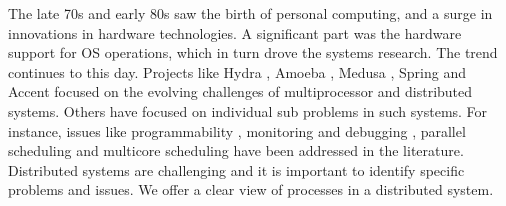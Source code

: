 \documentclass[draft]{article}
\begin{document}
The late 70s and early 80s  saw the birth of personal computing, and a
surge in innovations in hardware technologies.  A significant part was
the  hardware support  for  OS  operations, which  in  turn drove  the
systems  research.  The trend  continues to  this day.   Projects like
Hydra            \cite{Wulf:1975:OHO:1067629.806530},           Amoeba
\cite{Tanenbaum:1990:EAD:96267.96281},                           Medusa
\cite{Ousterhout:1980:MED:358818.358823},                        Spring
\cite{Stankovic:1989:SKN:71021.71024}            and            Accent
\cite{Rashid:1981:ACO:800216.806593}    focused   on    the   evolving
challenges  of multiprocessor  and distributed  systems.   Others have
focused  on individual sub  problems in  such systems.   For instance,
issues   like   programmability   \cite{Marques:1989:EOS:74877.74890},
monitoring and  debugging \cite{Tokuda:1988:RMD:68210.69222}, parallel
scheduling    \cite{Narang:2011:PDM:2007183.2007186}   and   multicore
scheduling    \cite{Shelepov:2009:HSH:1531793.1531804}    have    been
addressed               in               the               literature.
Distributed systems are challenging and it is
important to identify specific problems  and issues.  We offer a clear
view of processes in a distributed system.
\end{document}
